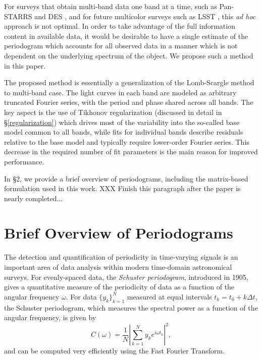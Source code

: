 \documentclass[12pt,preprint]{aastex}
\newcommand{\foreign}[1]{{\it #1}}
\newcommand{\adhoc}{\foreign{ad hoc}}
\newcommand{\eqlabel}[1]{\label{eq:#1}}
\begin{document}
For surveys that obtain multi-band data one band at a time, such as Pan-STARRS \citep{Kaiser2010} and DES \citep{Flaugher08},
and for future multicolor surveys such as LSST \citep{Ivezic08LSST}, this \adhoc{} approach is not optimal. In order to take 
advantage of the full information content in available data, it would be desirable to have a single estimate of the periodogram 
which accounts for all observed data in a manner which is not dependent on the underlying spectrum of the object. 
We propose such a method in this paper. 

The proposed method is essentially a generalization of the Lomb-Scargle method to 
multi-band case. The light curves in  each band are modeled as arbitrary truncated Fourier series, 
with the period and phase shared across all bands. The key aspect is the use of Tikhonov regularization 
(discussed in detail in \S \ref{regularization}) which drives most of the variability into the so-called base 
model common to all bands, while fits for individual bands describe residuals relative to the base model 
and typically require lower-order Fourier series. This decrease in the required number of fit parameters is the
main reason for improved performance. 

In \S 2, we provide a brief overview of periodograms, including the matrix-based formulation used in this work. 
XXX Finish this paragraph after the paper is nearly completed... 



\section{Brief Overview of Periodograms \label{sec:periodograms}} 

The detection and quantification of periodicity in time-varying signals is an important area of data analysis within modern time-domain astronomical surveys.
For evenly-spaced data, the {\it Schuster periodogram}, introduced in 1905, gives a quantitative measure of the periodicity of data as a function of the angular frequency $\omega$. For data $\{y_k\}_{k=1}^N$ measured at equal intervals $t_k = t_0 + k\Delta t$, the Schuster periodogram, which measures the spectral power as a function of the angular frequency, is given by
\begin{equation}
  \eqlabel{Schuster}
  C(\omega) = \frac{1}{N}\left| \sum_{k=1}^N y_k e^{i\omega t_k} \right|^2,
\end{equation}
and can be computed very efficiently using the Fast Fourier Transform.
\end{document}
